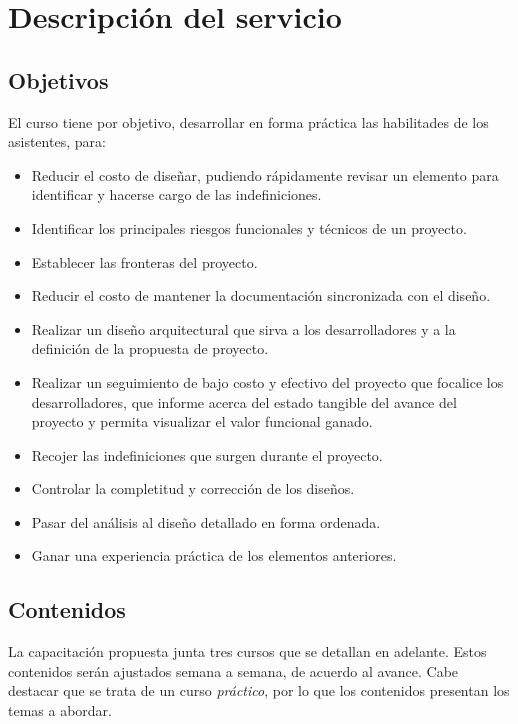 \documentclass[11pt]{article}
\begin{document}
\section{Descripci\'on del servicio}

\subsection{Objetivos}
El curso tiene por objetivo, desarrollar en forma pr\'actica las habilitades
de los asistentes, para:
\begin{itemize}
  \item
      Reducir el costo de dise\~nar, pudiendo r\'apidamente revisar un elemento
      para identificar y hacerse cargo de las indefiniciones.
  \item 
      Identificar los principales riesgos funcionales y t\'ecnicos de un proyecto.
  \item 
      Establecer las fronteras del proyecto.
  \item 
      Reducir el costo de mantener la documentaci\'on sincronizada con el dise\~no.
  \item 
      Realizar un dise\~no arquitectural que sirva a los desarrolladores y 
      a la definici\'on de la propuesta de proyecto.
  \item 
      Realizar un seguimiento de bajo costo y efectivo del proyecto que focalice
      los desarrolladores, que informe acerca del estado tangible del avance
      del proyecto y permita visualizar el valor funcional ganado.
  \item 
      Recojer las indefiniciones que surgen durante el proyecto.
  \item 
      Controlar la completitud y correcci\'on de los dise\~nos.
  \item 
      Pasar del an\'alisis al dise\~no detallado en forma ordenada.
  \item 
      Ganar una experiencia pr\'actica de los elementos anteriores.
\end{itemize}


\subsection{Contenidos}
La capacitaci\'on propuesta junta tres cursos que se detallan en adelante.
Estos contenidos ser\'an ajustados semana a semana, de acuerdo al avance.
Cabe destacar que se trata de un curso \emph{pr\'actico}, por lo que los contenidos
presentan los temas a abordar.
\end{document}
